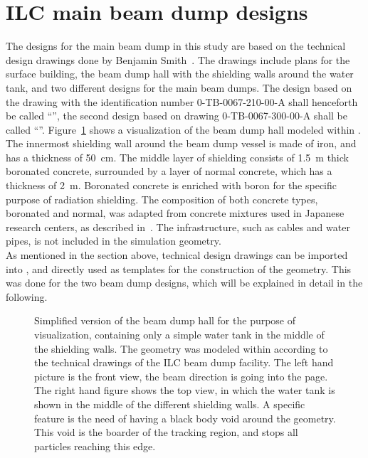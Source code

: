 \section{ILC main beam dump designs}
\label{BeamDumps:designs}
The designs for the main beam dump in this study are based on the technical design drawings done by Benjamin Smith~\cite{Smith_drawings}.
The drawings include plans for the surface building, the beam dump hall with the shielding walls around the water tank, and two different designs for the main beam dumps.
The design based on the drawing with the identification number 0-TB-0067-210-00-A shall henceforth be called ``\designone'', the second design based on drawing 0-TB-0067-300-00-A shall be called ``\designtwo''.
Figure~\ref{fig:BeamDumps:geometry} shows a visualization of the beam dump hall modeled within \flair. 
The innermost shielding wall around the beam dump vessel is made of iron, and has a thickness of \SI{50}{\centi\meter}.
The middle layer of shielding consists of \SI{1.5}{\meter} thick boronated concrete, surrounded by a layer of normal concrete, which has a thickness of \SI{2}{\meter}.
Boronated concrete is enriched with boron for the specific purpose of radiation shielding.
The composition of both concrete types, boronated and normal, was adapted from concrete mixtures used in Japanese research centers, as described in~\cite{concrete}. 
The infrastructure, such as cables and water pipes, is not included in the simulation geometry.
\\As mentioned in the section above, technical design drawings can be imported into \flair, and directly used as templates for the construction of the geometry.
This was done for the two beam dump designs, which will be explained in detail in the following.

\begin{figure}[hbp]
\begin{center}
\caption[Geometry visualization of the ILC main beam dump hall]{Simplified version of the beam dump hall for the purpose of visualization, containing only a simple water tank in the middle of the shielding walls. 
The geometry was modeled within \flair according to the technical drawings of the ILC beam dump facility.
The left hand picture is the front view, the beam direction is going into the page.
The right hand figure shows the top view, in which the water tank is shown in the middle of the different shielding walls. 
A \fluka specific feature is the need of having a black body void around the geometry. 
This void is the boarder of the tracking region, and stops all particles reaching this edge.}
\label{fig:BeamDumps:geometry}
\end{center}
\end{figure}

